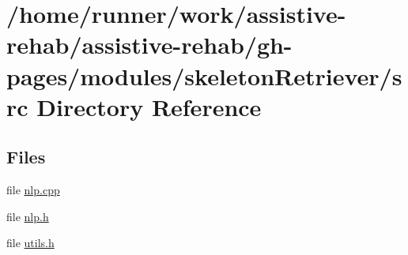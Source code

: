 \section{/home/runner/work/assistive-\/rehab/assistive-\/rehab/gh-\/pages/modules/skeleton\+Retriever/src Directory Reference}
\label{dir_297a1fbeae630d5d632032e7eb29a5e6}
\subsection*{Files}
\begin{DoxyCompactItemize}
\item 
file \hyperlink{nlp_8cpp}{nlp.\+cpp}
\item 
file \hyperlink{nlp_8h}{nlp.\+h}
\item 
file \hyperlink{utils_8h}{utils.\+h}
\end{DoxyCompactItemize}

